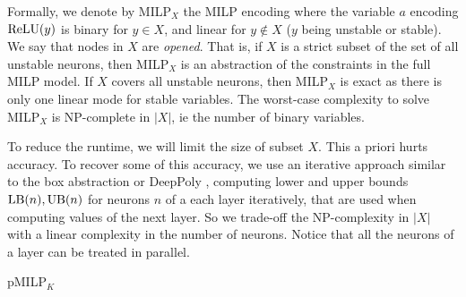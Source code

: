 Formally, we denote by MILP$_X$ the MILP encoding where the variable $a$ encoding $\mathrm{ReLU}(y)$ is binary for $y\in X$, and linear for $y\notin X$ ($y$ being unstable or stable). 
We say that nodes in $X$ are {\em opened}. 
That is, if $X$ is a strict subset of the set of all unstable neurons, then 
MILP$_X$ is an abstraction of the constraints in the full MILP model. If $X$ covers all unstable neurons, then MILP$_X$ is exact as there is only one linear mode for stable variables. The worst-case complexity to solve MILP$_X$ is NP-complete in $|X|$, ie the number of binary variables.

\smallskip

To reduce the runtime, we will limit the size of subset $X$. This a priori hurts accuracy. To recover some of this accuracy, we use an iterative approach similar to the box abstraction or DeepPoly \cite{deeppoly}, computing lower and upper bounds $\mathrm{LB}(n),\mathrm{UB}(n)$ for neurons $n$ of a each layer iteratively, that are used when computing values of the next layer.
So we trade-off the NP-complexity in $|X|$ with a linear complexity in the number of neurons. Notice that all the neurons of a layer can be treated in parallel.


\medskip




\begin{algorithm}[t!]
	\caption{pMILP$_K$}
	\label{algo1}
	
	
\end{algorithm}	


